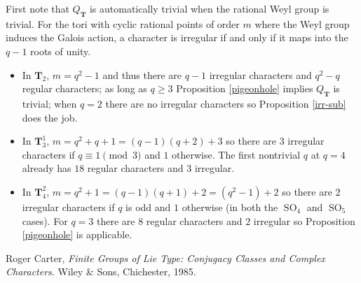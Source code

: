 \documentclass[11pt]{amsart}
\theoremstyle{plain}
\theoremstyle{definition}
\DeclareMathOperator{\SO}{SO}
\newcommand{\T}{\mathbf{T}}
\begin{document}
First note that $Q_{\T}$ is automatically trivial when the rational Weyl group is trivial.  For the tori with cyclic rational points of order $m$ where the Weyl group induces the Galois action, a character is irregular if and only if it maps into the $q-1$ roots of unity.
\begin{itemize}
\item In $\T_2$, $m=q^2 - 1$ and thus there are $q-1$ irregular characters and $q^2 - q$ regular characters; as long as $q \ge 3$ Proposition \ref{pigeonhole} implies $Q_{\T}$ is trivial; when $q = 2$ there are no irregular characters so Proposition \ref{irr-sub} does the job.
\item In $\T_3^1$, $m = q^2 + q + 1 = (q - 1)(q + 2) + 3$ so there are $3$ irregular characters if $q \equiv 1 \pmod{3}$ and $1$ otherwise.  The first nontrivial $q$ at $q=4$ already has $18$ regular characters and $3$ irregular.
\item In $\T_4^2$, $m = q^2 + 1 = (q-1)(q+1) + 2 = (q^2 - 1) + 2$ so there are $2$ irregular characters if $q$ is odd and $1$ otherwise (in both the $\SO_4$ and $\SO_5$ cases).  For $q = 3$ there are $8$ regular characters and $2$ irregular so Proposition \ref{pigeonhole} is applicable.
\end{itemize}

\begin{thebibliography}{9}
  Roger Carter,
  \emph{Finite Groups of Lie Type: Conjugacy Classes and Complex Characters}.  Wiley \& Sons, Chichester, 1985.
\end{thebibliography}
\end{document}
